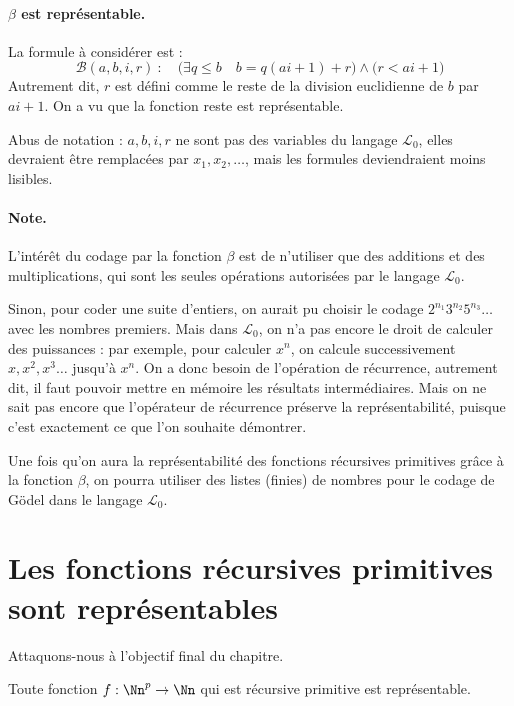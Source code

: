 \documentclass[11pt,class=report,crop=false]{standalone}
\begin{document}
    \paragraph{$\beta$ est représentable.}
    La formule à considérer est :
    \[ \mathcal{B}(a,b,i,r) \ : \quad  \big( \exists q \le b \quad b = q(ai+1)+r \big) \land \big( r < ai+1 \big) \]
    Autrement dit, $r$ est défini comme le reste de la division euclidienne de $b$ par $ai+1$. On a vu que la fonction reste est représentable.
    
    Abus de notation :
    $a, b, i, r$ ne sont pas des variables du langage $\mathcal{L}_0$, elles devraient être remplacées par $x_1,x_2,\ldots$, mais les formules deviendraient moins lisibles.

    \paragraph{Note.}
    L'intérêt du codage par la fonction $\beta$ est de n'utiliser que des additions et des multiplications, qui sont les seules opérations autorisées par le langage $\mathcal{L}_0$. 
    
    Sinon, pour coder une suite d'entiers, on aurait pu choisir le codage $2^{n_1} 3^{n_2} 5^{n_3} \dots$ avec les nombres premiers. Mais dans $\mathcal{L}_0$, on n'a pas encore le droit de calculer des puissances : par exemple, pour calculer $x^n$, on calcule successivement $x, x^2, x^3 \dots$ jusqu'à $x^n$. On a donc besoin de l'opération de récurrence, autrement dit, il faut pouvoir mettre en mémoire les résultats intermédiaires. Mais on ne sait pas encore que l'opérateur de récurrence préserve la représentabilité, puisque c'est exactement ce que l'on souhaite démontrer.

    Une fois qu'on aura la représentabilité des fonctions récursives primitives grâce à la fonction $\beta$, on pourra utiliser des listes (finies) de nombres pour le codage de Gödel dans le langage $\mathcal{L}_0$.


\section{Les fonctions récursives primitives sont représentables}

Attaquons-nous à l'objectif final du chapitre.

\begin{theoreme}
    \label{thm:fonction-representable}
    Toute fonction $f : \Nn^p \to \Nn$ qui est récursive primitive est représentable.
\end{theoreme}
\end{document}

